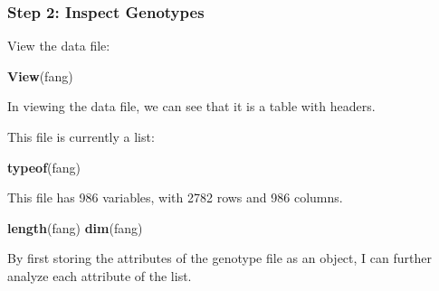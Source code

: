 \documentclass[]{article}
\newenvironment{Shaded}{\begin{snugshade}}{\end{snugshade}}
\newcommand{\KeywordTok}[1]{\textcolor[rgb]{0.13,0.29,0.53}{\textbf{#1}}}
\newcommand{\NormalTok}[1]{#1}
\newcommand{\OperatorTok}[1]{\textcolor[rgb]{0.81,0.36,0.00}{\textbf{#1}}}
\newcommand{\StringTok}[1]{\textcolor[rgb]{0.31,0.60,0.02}{#1}}
\begin{document}
\hypertarget{step-2-inspect-genotypes}{%
\subsubsection{Step 2: Inspect
Genotypes}\label{step-2-inspect-genotypes}}

View the data file:

\begin{Shaded}
\begin{Highlighting}[]
\KeywordTok{View}\NormalTok{(fang)}
\end{Highlighting}
\end{Shaded}

In viewing the data file, we can see that it is a table with headers.

This file is currently a list:

\begin{Shaded}
\begin{Highlighting}[]
\KeywordTok{typeof}\NormalTok{(fang)}
\end{Highlighting}
\end{Shaded}

This file has 986 variables, with 2782 rows and 986 columns.

\begin{Shaded}
\begin{Highlighting}[]
\KeywordTok{length}\NormalTok{(fang)}
\KeywordTok{dim}\NormalTok{(fang)}
\end{Highlighting}
\end{Shaded}

By first storing the attributes of the genotype file as an object, I can
further analyze each attribute of the list.

\begin{Shaded}
\end{Shaded}
\end{document}
